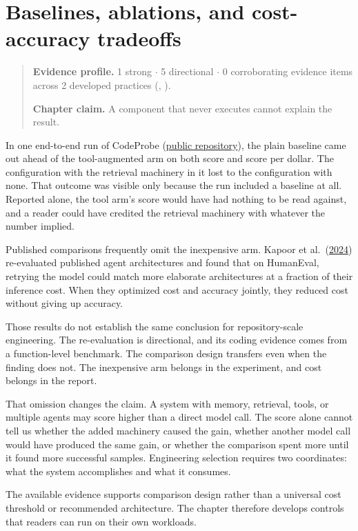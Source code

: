 \chapter{Baselines, ablations, and cost-accuracy tradeoffs}
\label{ch02-baselines-ablations-cost-accuracy}
\begin{quote}
\textbf{Evidence profile.} 1 strong \(\cdot\) 5 directional \(\cdot\) 0 corroborating evidence items across 2 developed practices (, ).

\textbf{Chapter claim.} A component that never executes cannot explain the result.
\end{quote}

In one end-to-end run of CodeProbe (\href{https://github.com/sjarmak/codeprobe}{public repository}), the plain baseline came out ahead of the tool-augmented arm on both score and score per dollar. The configuration with the retrieval machinery in it lost to the configuration with none. That outcome was visible only because the run included a baseline at all. Reported alone, the tool arm's score would have had nothing to be read against, and a reader could have credited the retrieval machinery with whatever the number implied.

Published comparisons frequently omit the inexpensive arm. Kapoor et al.~(\href{https://arxiv.org/abs/2407.01502}{2024}) re-evaluated published agent architectures and found that on HumanEval, retrying the model could match more elaborate architectures at a fraction of their inference cost. When they optimized cost and accuracy jointly, they reduced cost without giving up accuracy.

Those results do not establish the same conclusion for repository-scale engineering. The re-evaluation is directional, and its coding evidence comes from a function-level benchmark. The comparison design transfers even when the finding does not. The inexpensive arm belongs in the experiment, and cost belongs in the report.

That omission changes the claim. A system with memory, retrieval, tools, or multiple agents may score higher than a direct model call. The score alone cannot tell us whether the added machinery caused the gain, whether another model call would have produced the same gain, or whether the comparison spent more until it found more successful samples. Engineering selection requires two coordinates: what the system accomplishes and what it consumes.

The available evidence supports comparison design rather than a universal cost threshold or recommended architecture. The chapter therefore develops controls that readers can run on their own workloads.

